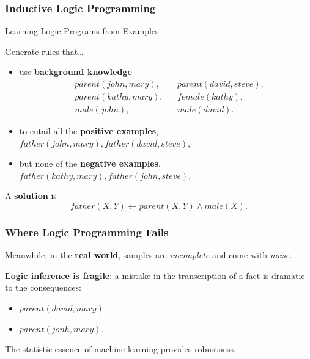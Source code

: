 \documentclass[bigger,xcolor={x11names,svgnames}]{beamer}
\begin{document}
%
\begin{frame}
    \frametitle{Inductive Logic Programming}
    \small

    \vfill
    \begin{center}
        Learning Logic Programs from Examples.
    \end{center}

    \vfill
    \alert{Generate rules} that\ldots
    \begin{itemize}
        \item use \textbf{background knowledge}
        $$
            \begin{aligned}
                 & parent(john,mary),  &  & parent(david,steve), \\
                 & parent(kathy,mary), &  & female(kathy),       \\
                 & male(john),         &  & male(david).
            \end{aligned}
        $$
        \item to entail all the \textbf{positive examples}, $father(john,mary), father(david,steve)$,
        \item but none of the \textbf{negative examples}. $father(kathy,mary), father(john,steve)$,
        
    \end{itemize}

    \vfill
    A \textbf{solution} is $$father(X,Y) \leftarrow parent(X,Y) \wedge male(X).$$

\end{frame}
%
\begin{frame}
    \frametitle{Where Logic Programming Fails}
    \begin{center}
        Meanwhile, in the \textbf{real world}, samples are \emph{incomplete} and come with \emph{noise}.
    \end{center}
    \vfill
    \textbf{Logic inference is \alert{fragile}}: a mistake in the transcription of a fact is dramatic to the consequences:
    \begin{itemize}
        \item $parent(david,mary)$.
        \item $parent(jonh,mary)$.
    \end{itemize}
    \vfill
    \begin{center}
        The statistic essence of machine learning provides \alert{robustness}.
    \end{center}
\end{frame}
%
%
\end{document}
